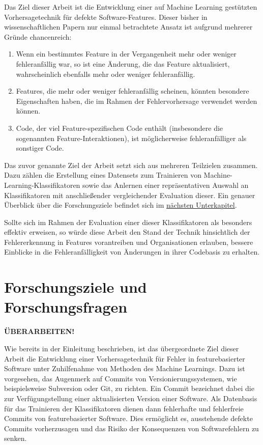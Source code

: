 Das Ziel dieser Arbeit ist die Entwicklung einer auf Machine Learning gestützten Vorhersagetechnik für defekte Software-Features. Dieser bisher in wissenschaftlichen Papern nur einmal betrachtete Ansatz ist aufgrund mehrerer Gründe chancenreich:

\begin{enumerate}
\item Wenn ein bestimmtes Feature in der Vergangenheit mehr oder weniger fehleranfällig war, so ist eine Änderung, die das Feature aktualisiert, wahrscheinlich ebenfalls mehr oder weniger fehleranfällig. 
\item Features, die mehr oder weniger fehleranfällig scheinen, könnten besondere Eigenschaften haben, die im Rahmen der Fehlervorhersage verwendet werden können.
\item Code, der viel Feature-spezifischen Code enthält (insbesondere die sogenannten Feature-Interaktionen), ist möglicherweise fehleranfälliger als sonstiger Code.
\end{enumerate}

Das zuvor genannte Ziel der Arbeit setzt sich aus mehreren Teilzielen zusammen. Dazu zählen die Erstellung eines Datensets zum Trainieren von Machine-Learning-Klassifikatoren sowie das Anlernen einer repräsentativen Auswahl an Klassifikatoren mit anschließender vergleichender Evaluation dieser. Ein genauer Überblick über die Forschungsziele befindet sich im \hyperref[research_objectives]{nächsten Unterkapitel}.

Sollte sich im Rahmen der Evaluation einer dieser Klassifikatoren als besonders effektiv erweisen, so würde diese Arbeit den Stand der Technik hinsichtlich der Fehlererkennung in Features vorantreiben und Organisationen erlauben, bessere Einblicke in die Fehleranfälligkeit von Änderungen in ihrer Codebasis zu erhalten.

\section{Forschungsziele und Forschungsfragen}

\textbf{ÜBERARBEITEN!}

Wie bereits in der Einleitung beschrieben, ist das übergeordnete Ziel dieser Arbeit die Entwicklung einer Vorhersagetechnik für Fehler in featurebasierter Software unter Zuhilfenahme von Methoden des Machine Learnings. Dazu ist vorgesehen, das Augenmerk auf Commits von Versionierungssystemen, wie beispielsweise Subversion oder Git, zu richten. Ein Commit bezeichnet dabei die zur Verfügungstellung einer aktualisierten Version einer Software. Als Datenbasis für das Trainieren der Klassifikatoren dienen dann fehlerhafte und fehlerfreie Commits von featurebasierter Software. Dies ermöglicht es, ausstehende defekte Commits vorherzusagen und das Risiko der Konsequenzen von Softwarefehlern zu senken.

